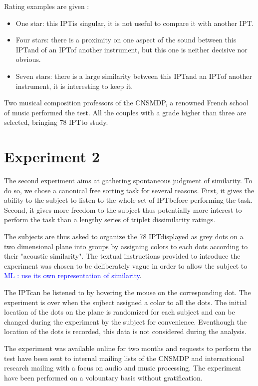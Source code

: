 \documentclass{article}
\newcommand{\ipt}{IPT}
\newcommand{\ml}[1]{\textcolor{blue}{ML : #1}}
\begin{document}
Rating examples are given :
\begin{itemize}
  \item One star: this \ipt is singular, it is not useful to compare it with another \ipt.
  \item Four stars: there is a proximity on one aspect of the sound between this \ipt and of an \ipt of another instrument, but this one is neither decisive nor obvious.
  \item Seven stars: there is a large similarity between this \ipt and an \ipt of another instrument, it is interesting to keep it.
\end{itemize}

Two musical composition professors of the CNSMDP, a renowned French school of music performed the test. All the couples with a grade higher than three are selected, bringing 78 \ipt to study.

\section{Experiment 2}\label{sec:xp2}

The second experiment aims at gathering spontaneous judgment of similarity. To do so, we chose a canonical free sorting task  for several reasons. First, it gives the ability to the subject to listen to the whole set of \ipt before performing the task. Second, it gives more freedom to the subject thus potentially more interest to perform the task than a lengthy series of triplet dissimilarity ratings.

The subjects are thus asked to organize the 78 \ipt displayed as grey dots on a two dimensional plane into groups by assigning colors to each dots according to their "acoustic similarity". The textual instructions provided to introduce the experiment was chosen to be deliberately vague in order to allow the subject to \ml{use its own representation of similarity}.

The \ipt can be listened to by hovering the mouse on the corresponding dot. The experiment is over when the sujbect assigned a color to all the dots. The initial location of the dots on the plane is randomized for each subject and can be changed during the experiment by the subject for convenience. Eventhough the location of the dots is recorded, this data is not considered during the analysis.

The experiment was available online for two months and requests to perform the test have been sent to internal mailing lists of the CNSMDP and international research mailing with a focus on audio and music processing. The experiment have been performed on a volountary basis without gratification.
\end{document}
